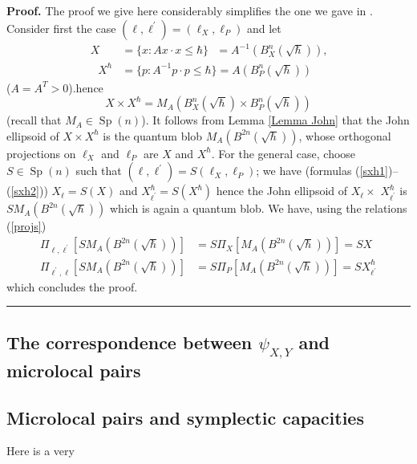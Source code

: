 \documentclass[11pt]{article}%
\newenvironment{proof}[1][Proof]{\noindent\textbf{#1.} }{\ \rule{0.5em}{0.5em}}
\begin{document}
\begin{proof}
The proof we give here considerably simplifies the one we gave in \cite{BSM}.
Consider first the case $(\ell,\ell^{\prime})=(\ell_{X},\ell_{P})$ and let
\begin{align}
X  &  =\{x:Ax\cdot x\leq\hbar\}\text{ \ }=A^{-1}(B_{X}^{n}(\sqrt{\hbar
}))\text{,}\\
\text{ \ }X^{\hbar}  &  =\{p:A^{-1}p\cdot p\leq\hbar\}=A(B_{P}^{n}(\sqrt
{\hbar}))
\end{align}
($A=A^{T}>0$).hence
\begin{equation}
X\times X^{\hbar}=M_{A}(B_{X}^{n}(\sqrt{\hbar})\times B_{P}^{n}(\sqrt{\hbar}))
\end{equation}
(recall that $M_{A}\in\operatorname*{Sp}(n)$). It follows from Lemma
\ref{Lemma John} that the John ellipsoid of $X\times X^{\hbar}$ is the quantum
blob $M_{A}(B^{2n}(\sqrt{\hbar}))$, whose orthogonal projections on $\ell_{X}$
and $\ell_{P}$ are $X$ and $X^{\hbar}$. For the general case, choose
$S\in\operatorname*{Sp}(n)$ such that $(\ell,\ell^{\prime})=S(\ell_{X}%
,\ell_{P})$; we have (formulas (\ref{sxh1})--(\ref{sxh2})) $X_{\ell}=S(X)$ and
$X_{\ell^{\prime}}^{\hbar}=S(X^{\hbar})$ hence the John ellipsoid of $X_{\ell
}\times$ $X_{\ell^{\prime}}^{\hbar}$ is $SM_{A}(B^{2n}(\sqrt{\hbar}))$ which
is again a quantum blob. We have, using the relations (\ref{projs})%
\begin{align*}
\Pi_{\ell,\ell^{\prime}}\left[  SM_{A}(B^{2n}(\sqrt{\hbar}))\right]   &
=S\Pi_{X}\left[  M_{A}(B^{2n}(\sqrt{\hbar}))\right]  =SX\\
\Pi_{\ell^{\prime},\ell}\left[  SM_{A}(B^{2n}(\sqrt{\hbar}))\right]   &
=S\Pi_{P}\left[  M_{A}(B^{2n}(\sqrt{\hbar}))\right]  =SX_{\ell^{\prime}%
}^{\hbar}%
\end{align*}
which concludes the proof.
\end{proof}

\subsection{The correspondence between $\psi_{X,Y}$ and microlocal pairs}

\subsection{Microlocal pairs and symplectic capacities}

Here is a very
\end{document}
